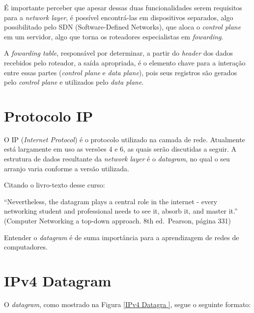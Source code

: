 É importante perceber que apesar dessas duas funcionalidades serem
requisitos para a \emph{network layer}, é possível encontrá-las em
dispositivos separados, algo possibilitado pelo SDN (Software-Defined
Networks), que aloca o \emph{control plane} em um servidor, algo que
torna os roteadores especialistas em \emph{fowarding}.

A \emph{fowarding table}, responsável por determinar, a partir do
\emph{header} dos dados recebidos pelo roteador, a saída apropriada, é o
elemento chave para a interação entre essas partes (\emph{control plane}
e \emph{data plane}), pois seus registros são gerados pelo \emph{control
plane} e utilizados pelo \emph{data plane}.

\hypertarget{protocolo-ip}{%
\section{Protocolo IP}\label{protocolo-ip}}

O IP (\emph{Internet Protocol}) é o protocolo utilizado na camada de
rede. Atualmente está largamente em uso as versões 4 e 6, as quais serão
discutidas a seguir. A estrutura de dados resultante da \emph{network
layer} é o \emph{datagram}, no qual o seu arranjo varia conforme a
versão utilizada.

Citando o livro-texto desse curso:

``Nevertheless, the datagram plays a central role in the internet -
every networking student and professional needs to see it, absorb it,
and master it.'' (Computer Networking a top-down approach. 8th
ed.~Pearson, página 331)

Entender o \emph{datagram} é de suma importância para a aprendizagem de
redes de computadores.

\hypertarget{ipv4-datagram}{%
\section{IPv4 Datagram}\label{ipv4-datagram}}

O \emph{datagram}, como mostrado na Figura \ref{IPv4 Datagra }, segue o seguinte formato:

